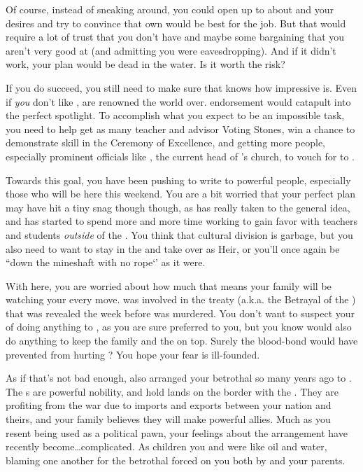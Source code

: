 \documentclass[char]{GL2020}
\begin{document}
{Of course, instead of sneaking around, you could open up to \cDiplomat{} about \cAmbition{} and your desires and try to convince \cDiplomat{\them} that \cDiplomat{\their} own \aAmbition{\offspring} would be best for the job. But that would require a lot of trust that you don’t have and maybe some bargaining that you aren’t very good at (and admitting you were eavesdropping). And if it didn’t work, your plan would be dead in the water. Is it worth the risk? 

If you do succeed, you still need to make sure that \cDiplomat{} knows how impressive \cAmbition{} is. Even if \emph{you} don’t like \cDiplomat{\them}, \cDiplomat{\they} are renowned the world over. \cDiplomat{\Their} endorsement would catapult \cAmbition{} into the perfect spotlight. To accomplish what you expect to be an impossible task, you need to help \cAmbition{\them} get as many teacher and advisor Voting Stones, win a chance to demonstrate \cAmbition{\their} skill in the Ceremony of Excellence, and getting more people, especially prominent \pTech{} officials like \cAntiChup{\full}, the current head of \cTechGod{}’s church, to vouch for \cAmbition{\them} to \cDiplomat{}. 

Towards this goal, you have been pushing \cAmbition{} to write to powerful people, especially those who will be here this weekend. You are a bit worried that your perfect plan may have hit a tiny snag though though, as \cAmbition{} has really taken to the general idea, and has started to spend more and more time working to gain favor with teachers and students \emph{outside} of the \pTech{}. You think that cultural division is garbage, but you also need \cAmbition{\them} to want to stay in the \pTech{} and take over as Heir, or you’ll once again be ``down the mineshaft with no rope‘’ as it were.    

With \cDiplomat{} here, you are worried about how much that means your family will be watching your every move. \cDiplomat{} was involved in the treaty (a.k.a. the Betrayal of the \pShippies{}) that was revealed the week before \cHeirSibling{} was murdered. You don’t want to suspect your \cDiplomat{\auncle} of doing anything to \cHeirSibling{}, as you are sure \cDiplomat{\they} preferred \cHeirSibling{\them} to you, but you know \cDiplomat{\they} would also do anything to keep the family and the \pTechies{} on top. Surely the blood-bond would have prevented \cDiplomat{} from hurting \cHeirSibling{}? You hope your fear is ill-founded. 

As if that's not bad enough, \cDiplomat{} also arranged your betrothal so many years ago to \cChupStudent{}. The \cChupStudent{\formal}s are powerful \pFarm{} nobility, and hold lands on the border with the \pTech{}. They are profiting from the war due to imports and exports between your nation and theirs, and your family believes they will make powerful allies. Much as you resent being used as a political pawn, your feelings about the arrangement have recently become\ldots complicated. As children you and \cChupStudent{} were like oil and water, blaming one another for the betrothal forced on you both by \cDiplomat{} and your parents.

}
\end{document}
